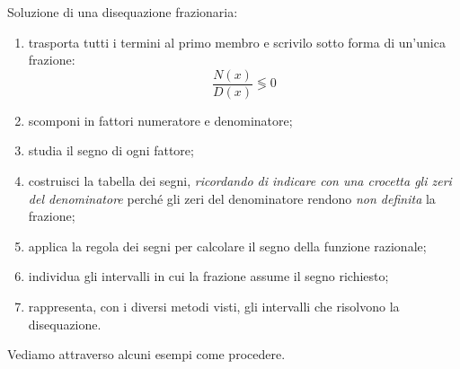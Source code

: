\begin{procedura}{}{}
Soluzione di una disequazione frazionaria:
\begin{enumerate} [noitemsep]
\item trasporta tutti i termini al primo membro e scrivilo sotto forma di 
 un'unica frazione:\\
\[\frac{N(x)}{D(x)} \lessgtr 0\]
\item scomponi in fattori numeratore e denominatore;
\item studia il segno di ogni fattore;
\item costruisci la tabella dei segni, 
\emph{ricordando di indicare con una crocetta gli zeri del denominatore}
perché gli zeri del denominatore rendono \emph{non definita} la frazione;
\item applica la regola dei segni per calcolare il segno della funzione 
razionale;
\item individua gli intervalli in cui la frazione assume il segno richiesto;
\item rappresenta, con i diversi metodi visti, gli intervalli che 
 risolvono la disequazione.
\end{enumerate}
\end{procedura}

Vediamo attraverso alcuni esempi come procedere.

